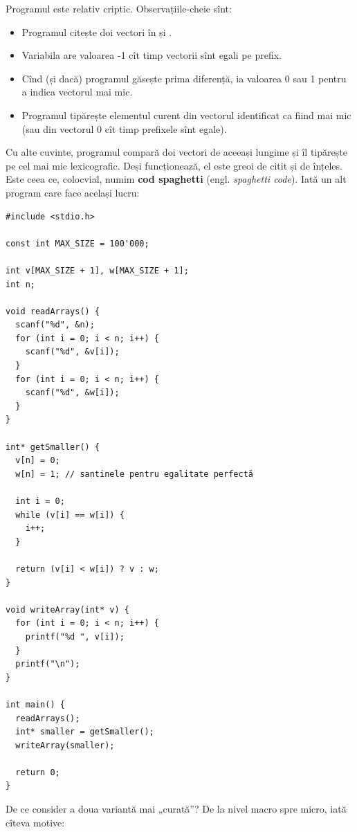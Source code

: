 \documentclass[../main.tex]{subfiles}
\begin{document}
Programul este relativ criptic. Observațiile-cheie sînt:

\begin{itemize}
  \item Programul citește doi vectori în  și .
  \item Variabila  are valoarea -1 cît timp vectorii sînt egali pe prefix.
  \item Cînd (și dacă) programul găsește prima diferență,  ia valoarea 0 sau 1 pentru a indica vectorul mai mic.
  \item Programul tipărește elementul curent din vectorul identificat ca fiind mai mic (sau din vectorul 0 cît timp prefixele sînt egale).
\end{itemize}

Cu alte cuvinte, programul compară doi vectori de aceeași lungime  și îl tipărește pe cel mai mic lexicografic. Deși funcționează, el este greoi de citit și de înțeles. Este ceea ce, colocvial, numim \textbf{cod spaghetti} (engl. \textit{spaghetti code}). Iată un alt program care face același lucru:

\begin{verbatim}
#include <stdio.h>

const int MAX_SIZE = 100'000;

int v[MAX_SIZE + 1], w[MAX_SIZE + 1];
int n;

void readArrays() {
  scanf("%d", &n);
  for (int i = 0; i < n; i++) {
    scanf("%d", &v[i]);
  }
  for (int i = 0; i < n; i++) {
    scanf("%d", &w[i]);
  }
}

int* getSmaller() {
  v[n] = 0;
  w[n] = 1; // santinele pentru egalitate perfectă

  int i = 0;
  while (v[i] == w[i]) {
    i++;
  }

  return (v[i] < w[i]) ? v : w;
}

void writeArray(int* v) {
  for (int i = 0; i < n; i++) {
    printf("%d ", v[i]);
  }
  printf("\n");
}

int main() {
  readArrays();
  int* smaller = getSmaller();
  writeArray(smaller);

  return 0;
}
\end{verbatim}

De ce consider a doua variantă mai „curată”? De la nivel macro spre micro, iată cîteva motive:
\end{document}
